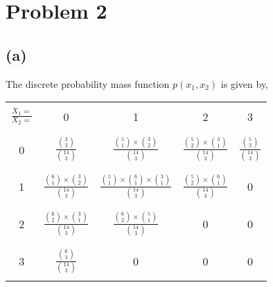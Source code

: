 \documentclass{article}
\begin{document}
	\section*{Problem 2}
		\subsection*{(a)}
			The discrete probability mass function $p(x_1,x_2)$ is given by,
			\begin{center}
			\begin{tabular}{ |c|c|c|c|c|}
			\hline
			& & & &  \\
			$\frac{X_1=}{X_2=}$ & 0 & 1 & 2 & 3 \\
			& & & &  \\
			\hline
			& & & &  \\
			0 & $\frac{{3 \choose 3}}{{14 \choose 3}}$ & $\frac{{5 \choose 1}\times{3 \choose 2}}{{14 \choose 3}}$ & $\frac{{5 \choose 2}\times{3 \choose 1}}{{14 \choose 3}}$ & $\frac{{5 \choose 3}}{{14 \choose 3}}$  \\
			& & & &  \\
			\hline
			& & & &  \\
			1 & $\frac{{6 \choose 1}\times{3 \choose 2}}{{14 \choose 3}}$  & $\frac{{5 \choose 1}\times{6 \choose 1}\times{3 \choose 1}}{{14 \choose 3}}$ & $\frac{{5 \choose 2}\times{6 \choose 1}}{{14 \choose 3}}$ & 0  \\
			& & & &  \\
			\hline
			& & & &  \\
			2 & $\frac{{6 \choose 2}\times{3 \choose 1}}{{14 \choose 3}}$ & $\frac{{6 \choose 2}\times{5 \choose 1}}{{14 \choose 3}}$ & 0 & 0 \\
			& & & &  \\
			\hline
			& & & &  \\
			3 & $\frac{{6 \choose 3}}{{14 \choose 3}}$ & 0 & 0 & 0 \\
			& & & &  \\
			\hline
			\end{tabular}
			\end{center}
\end{document}
